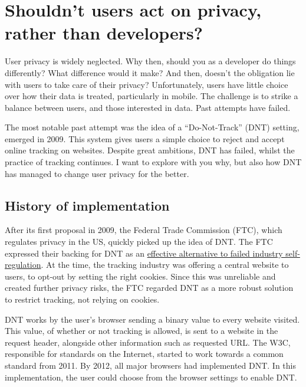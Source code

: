\documentclass[
]{book}
\begin{document}
\hypertarget{shouldnt-users-act-on-privacy-rather-than-developers}{%
\section{Shouldn't users act on privacy, rather than developers?}\label{shouldnt-users-act-on-privacy-rather-than-developers}}

User privacy is widely neglected. Why then, should you as a developer do things differently? What difference would it make? And then, doesn't the obligation lie with users to take care of their privacy? Unfortunately, users have little choice over how their data is treated, particularly in mobile. The challenge is to strike a balance between users, and those interested in data. Past attempts have failed.

The most notable past attempt was the idea of a ``Do-Not-Track'' (DNT) setting, emerged in 2009. This system gives users a simple choice to reject and accept online tracking on websites. Despite great ambitions, DNT has failed, whilst the practice of tracking continues. I want to explore with you why, but also how DNT has managed to change user privacy for the better.

\hypertarget{history-of-implementation}{%
\subsection{History of implementation}\label{history-of-implementation}}

After its first proposal in 2009, the Federal Trade Commission (FTC), which regulates privacy in the US, quickly picked up the idea of DNT. The FTC expressed their backing for DNT as an \href{https://www.wired.com/2010/12/ftc-do-not-track/}{effective alternative to failed industry self-regulation}. At the time, the tracking industry was offering a central website to users, to opt-out by setting the right cookies. Since this was unreliable and created further privacy risks, the FTC regarded DNT as a more robust solution to restrict tracking, not relying on cookies.

DNT works by the user's browser sending a binary value to every website visited. This value, of whether or not tracking is allowed, is sent to a website in the request header, alongside other information such as requested URL. The W3C, responsible for standards on the Internet, started to work towards a common standard from 2011. By 2012, all major browsers had implemented DNT. In this implementation, the user could choose from the browser settings to enable DNT.
\end{document}
